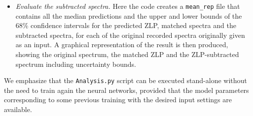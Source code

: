\begin{itemize}
\item {\it Evaluate the subtracted spectra.}
%
Here the code creates a {\tt mean\_rep} file that contains
all the median predictions and the upper and lower bounds of the 68\% confidence intervals for 
the predicted ZLP, matched spectra and the subtracted spectra, for each of the original recorded
spectra originally given as an input. 
%
A graphical representation
of the result is then produced, showing the original spectrum, the matched
ZLP and the ZLP-subtracted spectrum including uncertainty bounds. 

\end{itemize}

We emphasize that the {\tt Analysis.py} script can be executed stand-alone
without the need to train again the neural networks, provided that
the model parameters corresponding to some previous training with
the desired input settings are available.


















